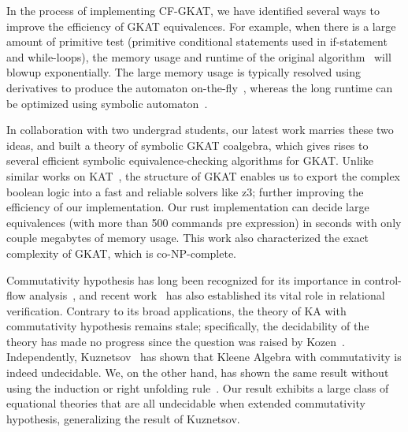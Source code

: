 \documentclass[11pt,a4paper,sans]{moderncv} %
\begin{document}


In the process of implementing CF-GKAT, we have identified several ways to improve the efficiency of GKAT equivalences.
For example, when there is a large amount of primitive test (primitive conditional statements used in if-statement and while-loops), the memory usage and runtime of the original algorithm~\cite{smolka_GuardedKleeneAlgebra_2020} will blowup exponentially. 
The large memory usage is typically resolved using derivatives to produce the automaton on-the-fly~\cite{brzozowski_DerivativesRegularExpressions_1964, schmid_GuardedKleeneAlgebra_2021}, whereas the long runtime can be optimized using symbolic automaton~\cite{pous_SymbolicAlgorithmsLanguage_2015}. 

In collaboration with two undergrad students, our latest work marries these two ideas, and built a theory of symbolic GKAT coalgebra, which gives rises to several efficient symbolic equivalence-checking algorithms for GKAT. 
Unlike similar works on KAT~\cite{pous_SymbolicAlgorithmsLanguage_2015}, the structure of GKAT enables us to export the complex boolean logic into a fast and reliable solvers like z3; further improving the efficiency of our implementation.
Our rust implementation can decide large equivalences (with more than 500 commands pre expression) in seconds with only couple megabytes of memory usage.
This work also characterized the exact complexity of GKAT, which is co-NP-complete.



Commutativity hypothesis has long been recognized for its importance in control-flow analysis~\cite{kozen_KleeneAlgebraTests_1996}, and recent work~\cite{antonopoulos_AlgebraAlignmentRelational_2023} has also established its vital role in relational verification. 
Contrary to its broad applications, the theory of KA with commutativity hypothesis remains stale; specifically, the decidability of the theory has made no progress since the question was raised by Kozen~\cite{kozen_KleeneAlgebraTests_1996}.
Independently, Kuznetsov~\cite{kuznetsov_ComplexityReasoningKleene_2023} has shown that Kleene Algebra with commutativity is indeed undecidable. We, on the other hand, has shown the same result without using the induction or right unfolding rule~\cite{azevedodeamorim_KleeneAlgebraCommutativity_2024}. 
Our result exhibits a large class of equational theories that are all undecidable when extended commutativity hypothesis, generalizing the result of Kuznetsov.
\end{document}
